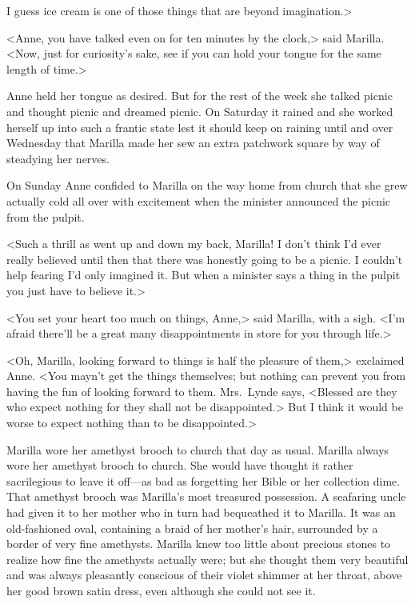 I guess ice cream is one of those things that are beyond imagination.>

<Anne, you have talked even on for ten minutes by the clock,> said Marilla. <Now, just for curiosity's sake, see if you can hold your tongue for the same length of time.>

Anne held her tongue as desired. But for the rest of the week she talked picnic and thought picnic and dreamed picnic. On Saturday it rained and she worked herself up into such a frantic state lest it should keep on raining until and over Wednesday that Marilla made her sew an extra patchwork square by way of steadying her nerves.

On Sunday Anne confided to Marilla on the way home from church that she grew actually cold all over with excitement when the minister announced the picnic from the pulpit.

<Such a thrill as went up and down my back, Marilla! I don't think I'd ever really believed until then that there was honestly going to be a picnic. I couldn't help fearing I'd only imagined it. But when a minister says a thing in the pulpit you just have to believe it.>

<You set your heart too much on things, Anne,> said Marilla, with a sigh. <I'm afraid there'll be a great many disappointments in store for you through life.>

<Oh, Marilla, looking forward to things is half the pleasure of them,> exclaimed Anne. <You mayn't get the things themselves; but nothing can prevent you from having the fun of looking forward to them. Mrs.~Lynde says, <Blessed are they who expect nothing for they shall not be disappointed.> But I think it would be worse to expect nothing than to be disappointed.>

Marilla wore her amethyst brooch to church that day as usual. Marilla always wore her amethyst brooch to church. She would have thought it rather sacrilegious to leave it off—as bad as forgetting her Bible or her collection dime. That amethyst brooch was Marilla's most treasured possession. A seafaring uncle had given it to her mother who in turn had bequeathed it to Marilla. It was an old-fashioned oval, containing a braid of her mother's hair, surrounded by a border of very fine amethysts. Marilla knew too little about precious stones to realize how fine the amethysts actually were; but she thought them very beautiful and was always pleasantly conscious of their violet shimmer at her throat, above her good brown satin dress, even although she could not see it.

